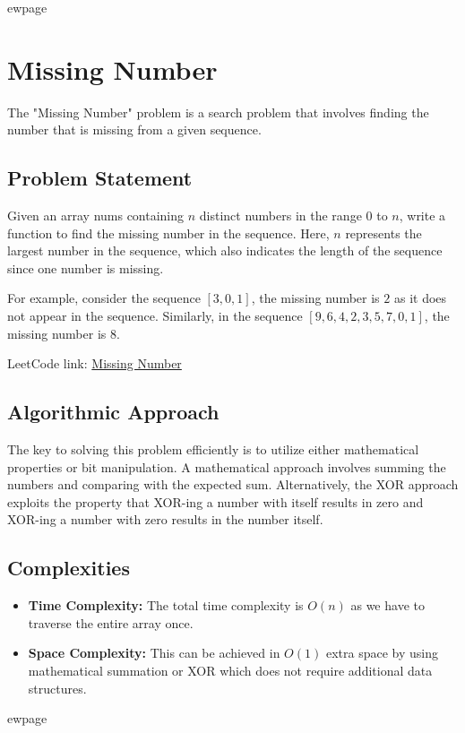 
ewpage

\chapter{Missing Number}
\label{chap:Missing_Number}
The "Missing Number" problem is a search problem that involves finding the number that is missing from a given sequence.

\section*{Problem Statement}
Given an array nums containing \(n\) distinct numbers in the range \(0\) to \(n\), write a function to find the missing number in the sequence. Here, \(n\) represents the largest number in the sequence, which also indicates the length of the sequence since one number is missing.

For example, consider the sequence \([3,0,1]\), the missing number is \(2\) as it does not appear in the sequence. Similarly, in the sequence \([9,6,4,2,3,5,7,0,1]\), the missing number is \(8\).

LeetCode link: \href{https://leetcode.com/problems/missing-number/}{Missing Number}

\section*{Algorithmic Approach}
The key to solving this problem efficiently is to utilize either mathematical properties or bit manipulation. A mathematical approach involves summing the numbers and comparing with the expected sum. Alternatively, the XOR approach exploits the property that XOR-ing a number with itself results in zero and XOR-ing a number with zero results in the number itself.

\section*{Complexities}
\begin{itemize}
	\item \textbf{Time Complexity:} The total time complexity is \(O(n)\) as we have to traverse the entire array once.
	\item \textbf{Space Complexity:} This can be achieved in \(O(1)\) extra space by using mathematical summation or XOR which does not require additional data structures.
\end{itemize}


ewpage %

